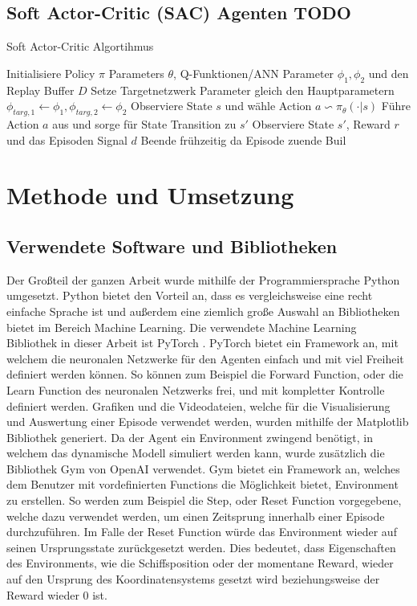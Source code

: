 \documentclass[]{iat}
\begin{document}
\section{Soft Actor-Critic (SAC) Agenten TODO} \label{sec:howto_sac}
\begin{algorithm}
    \caption{Soft Actor-Critic Algortihmus}\label{pse:sac_pseudo}
    \begin{algorithmic}[1]
        \State Initialisiere Policy $\pi$ Parameters $\theta$, Q-Funktionen/ANN Parameter $\phi_1, \phi_2$ und den Replay Buffer $D$
        \State Setze Targetnetzwerk Parameter gleich den Hauptparametern $\phi_{targ,1} \leftarrow \phi_1, \phi_{targ,2} \leftarrow \phi_2$
        \State Observiere State $s$ und wähle Action $a \backsim \pi_{\theta}(\cdot | s)$
        \State Führe Action $a$ aus und sorge für State Transition zu $s'$
        \State Observiere State $s'$, Reward $r$ und das Episoden Signal $d$
        \State Beende frühzeitig da Episode zuende
        \EndIf
        \State Buil
        \EndFor
    \end{algorithmic}
\end{algorithm}

\chapter{Methode und Umsetzung} \label{sec:methode_umsetzung}

\section{Verwendete Software und Bibliotheken} \label{sec:software_bibs}
Der Großteil der ganzen Arbeit wurde mithilfe der Programmiersprache Python \cite[]{python} umgesetzt. Python bietet den Vorteil an, dass es vergleichsweise eine recht einfache Sprache ist und außerdem eine ziemlich große Auswahl an Bibliotheken bietet im Bereich Machine Learning. Die verwendete Machine Learning Bibliothek in dieser Arbeit ist PyTorch \cite[]{pytorch}. PyTorch bietet ein Framework an, mit welchem die neuronalen Netzwerke für den Agenten einfach und mit viel Freiheit definiert werden können. So können zum Beispiel die Forward Function, oder die Learn Function des neuronalen Netzwerks frei, und mit kompletter Kontrolle definiert werden. Grafiken und die Videodateien, welche für die Visualisierung und Auswertung einer Episode verwendet werden, wurden mithilfe der Matplotlib \cite[]{matpltlib} Bibliothek generiert. Da der Agent ein Environment zwingend benötigt, in welchem das dynamische Modell simuliert werden kann, wurde zusätzlich die Bibliothek Gym von OpenAI \cite[]{brockman2016openai} verwendet. Gym bietet ein Framework an, welches dem Benutzer mit vordefinierten Functions die Möglichkeit bietet, Environment zu erstellen. So werden zum Beispiel die Step, oder Reset Function vorgegebene, welche dazu verwendet werden, um einen Zeitsprung innerhalb einer Episode durchzuführen. Im Falle der Reset Function würde das Environment wieder auf seinen Ursprungsstate zurückgesetzt werden. Dies bedeutet, dass Eigenschaften des Environments, wie die Schiffsposition oder der momentane Reward, wieder auf den Ursprung des Koordinatensystems gesetzt wird beziehungsweise der Reward wieder 0 ist.
\end{document}

